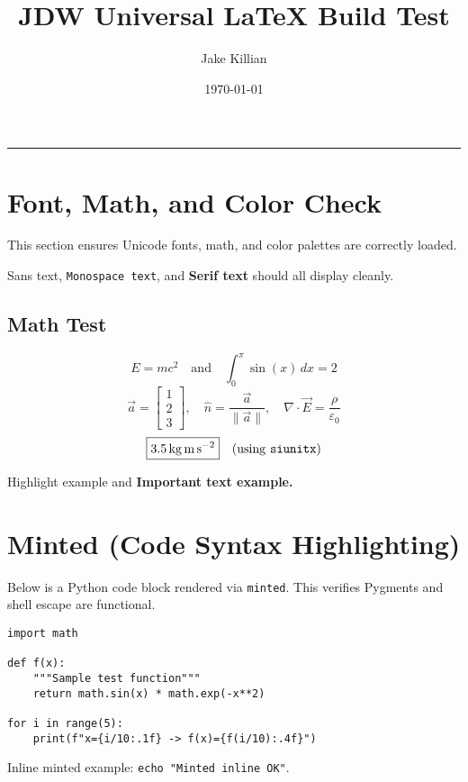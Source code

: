 \documentclass[12pt]{article}
\title{JDW Universal LaTeX Build Test}
\author{Jake Killian}
\date{\today}
\theoremstyle{plain}
\theoremstyle{definition}
\theoremstyle{remark}
\numberwithin{equation}{section}
\newcommand{\highlight}[1]{\colorbox{Highlighter}{#1}}
\newcommand{\important}[1]{\textcolor{Alert}{\textbf{#1}}}
\providecommand{\PrintTitleRule}{}
\renewcommand{\PrintTitleRule}{%
  \par\medskip
  \begin{center}{\color{AccentColor}\rule{0.6\linewidth}{0.6pt}}\end{center}
  \par\medskip
}
\begin{document}
\maketitle
\PrintTitleRule

\tableofcontents
\pagebreak

\section{Font, Math, and Color Check}
This section ensures Unicode fonts, math, and color palettes are correctly loaded.

\textsf{Sans text}, \texttt{Monospace text}, and \textbf{Serif text} should all display cleanly.

\subsection{Math Test}
\[
    E = mc^2 \quad\text{and}\quad \int_0^{\pi}\sin(x)\,dx = 2
\]
\[
    \vec{a} = \begin{bmatrix}1\\2\\3\end{bmatrix}, \quad
    \hat{n} = \frac{\vec{a}}{\|\vec{a}\|}, \quad
    \nabla \cdot \vec{E} = \frac{\rho}{\varepsilon_0}
\]
\[
    \boxed{\SI{3.5}{\kilo\gram\metre\per\square\second}} \quad
    \text{(using \texttt{siunitx})}
\]

\highlight{Highlight example} and \important{Important text example.}

\section{Minted (Code Syntax Highlighting)}
Below is a Python code block rendered via \texttt{minted}.
This verifies Pygments and shell escape are functional.

\begin{verbatim}
import math

def f(x):
    """Sample test function"""
    return math.sin(x) * math.exp(-x**2)

for i in range(5):
    print(f"x={i/10:.1f} -> f(x)={f(i/10):.4f}")
\end{verbatim}

Inline minted example: \texttt{echo "Minted inline OK"}.
\end{document}
